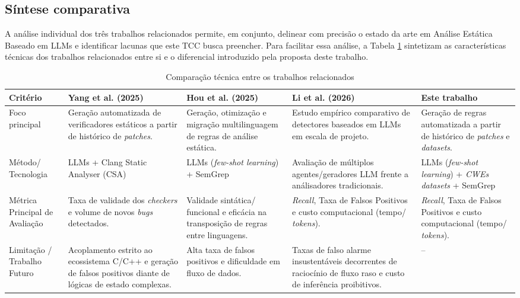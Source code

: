 \documentclass[
    12pt,                %
    openright,           %
    oneside,             %
    a4paper,             %
    english,             %
    brazil               %
]{abntex2}
\begin{document}
\begin{itemize}
\subsection{Síntese comparativa}
\par
A análise individual dos três trabalhos relacionados permite, em conjunto, delinear com precisão o estado da arte em Análise Estática Baseado em LLMs e identificar lacunas que este TCC busca preencher.
Para facilitar essa análise, a Tabela \ref{tab:trabalhosrelacionados} sintetizam as características técnicas dos trabalhos relacionados entre si e o diferencial introduzido pela proposta deste trabalho.

\begin{table}[htb]
    \centering
    \caption{Comparação técnica entre os trabalhos relacionados}
    \label{tab:trabalhosrelacionados}
    \begin{tabular}{p{2cm}|p{3cm}|p{3cm}|p{3cm}|p{3cm}}
        \toprule
        \textbf{Critério} 
        & \textbf{Yang et al. (2025)} 
        & \textbf{Hou et al. (2025)} 
        & \textbf{Li et al. (2026)}
        & \textbf{Este trabalho} \\
        \midrule
        Foco principal
        & Geração automatizada de verificadores estáticos a partir de histórico de \textit{patches}.
        & Geração, otimização e migração multilinguagem de regras de análise estática.
        & Estudo empírico comparativo de detectores baseados em LLMs em escala de projeto.
        & Geração de regras automatizada a partir de histórico de \textit{patches} e \textit{datasets}. \\
        \midrule
        Método/ Tecnologia           
        & LLMs + Clang Static Analyser (CSA) 
        & LLMs (\textit{few-shot learning}) + SemGrep
        & Avaliação de múltiplos agentes/geradores LLM frente a análisadores tradicionais.   
        & LLMs (\textit{few-shot learning}) + \textit{CWEs datasets} + SemGrep \\
        \midrule
        Métrica Principal de Avaliação
        & Taxa de validade dos \textit{checkers} e volume de novos \textit{bugs} detectados.
        & Validade sintática/ funcional e eficácia na transposição de regras entre linguagens.
        & \textit{Recall}, Taxa de Falsos Positivos e custo computacional (tempo/ \textit{tokens}).
        & \textit{Recall}, Taxa de Falsos Positivos e custo computacional (tempo/ \textit{tokens}). \\
        \midrule
        Limitação / Trabalho Futuro
        & Acoplamento estrito ao ecossistema C/C++ e geração de falsos positivos diante de lógicas de estado complexas.
        & Alta taxa de falsos positivos e dificuldade em fluxo de dados.
        & Taxas de falso alarme insustentáveis decorrentes de raciocínio de fluxo raso e custo de inferência proibitivos. 
        & -- \\
        \bottomrule
    \end{tabular}
\end{table}


\end{itemize}
\end{document}
